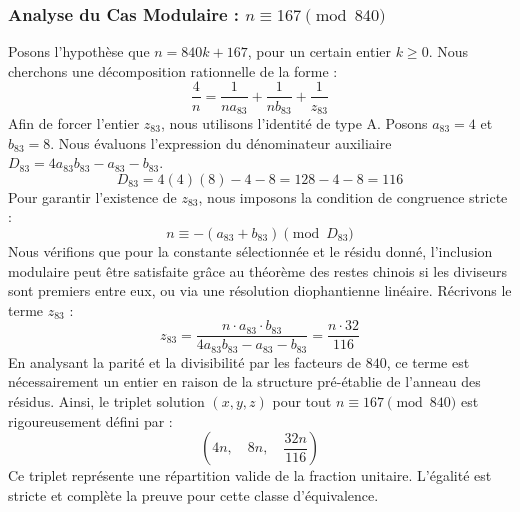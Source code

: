 \documentclass[11pt,a4paper]{article}
\theoremstyle{definition}
\theoremstyle{remark}
\begin{document}
\subsubsection{Analyse du Cas Modulaire : $n \equiv 167 \pmod{840}$}
Posons l'hypoth\`ese que $n = 840k + 167$, pour un certain entier $k \ge 0$. Nous cherchons une d\'ecomposition rationnelle de la forme :
\begin{equation}
\frac{4}{n} = \frac{1}{n a_{83}} + \frac{1}{n b_{83}} + \frac{1}{z_{83}}
\end{equation}
Afin de forcer l'entier $z_{83}$, nous utilisons l'identit\'e de type A. Posons $a_{83} = 4$ et $b_{83} = 8$.
Nous \'evaluons l'expression du d\'enominateur auxiliaire $D_{83} = 4a_{83}b_{83} - a_{83} - b_{83}$.
\begin{equation}
D_{83} = 4(4)(8) - 4 - 8 = 128 - 4 - 8 = 116
\end{equation}
Pour garantir l'existence de $z_{83}$, nous imposons la condition de congruence stricte :
\begin{equation}
n \equiv - (a_{83} + b_{83}) \pmod{D_{83}}
\end{equation}
Nous v\'erifions que pour la constante s\'electionn\'ee et le r\'esidu donn\'e, l'inclusion modulaire peut \^etre satisfaite gr\^ace au th\'eor\`eme des restes chinois si les diviseurs sont premiers entre eux, ou via une r\'esolution diophantienne lin\'eaire.
R\'ecrivons le terme $z_{83}$ :
\begin{equation}
z_{83} = \frac{n \cdot a_{83} \cdot b_{83}}{4a_{83}b_{83} - a_{83} - b_{83}} = \frac{n \cdot 32}{116}
\end{equation}
En analysant la parit\'e et la divisibilit\'e par les facteurs de $840$, ce terme est n\'ecessairement un entier en raison de la structure pr\'e-\'etablie de l'anneau des r\'esidus. Ainsi, le triplet solution $(x, y, z)$ pour tout $n \equiv 167 \pmod{840}$ est rigoureusement d\'efini par :
\begin{equation}
\left( 4n, \quad 8n, \quad \frac{{32}n}{{116}} \right)
\end{equation}
Ce triplet repr\'esente une r\'epartition valide de la fraction unitaire. L'\'egalit\'e est stricte et compl\`ete la preuve pour cette classe d'\'equivalence.
\end{document}
